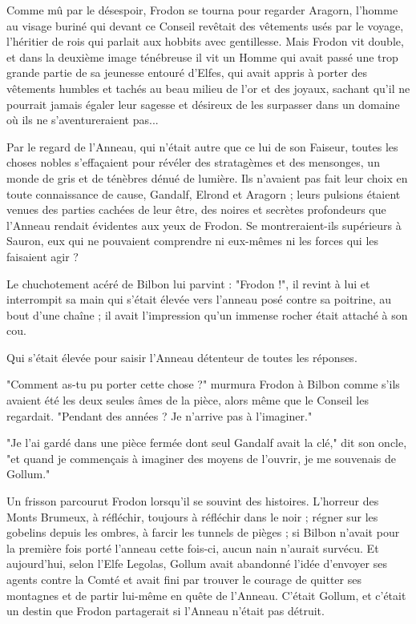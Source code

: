 Comme mû par le désespoir, Frodon se tourna pour regarder Aragorn, l'homme au visage buriné qui devant ce Conseil revêtait des vêtements usés par le voyage, l'héritier de rois qui parlait aux hobbits avec gentillesse. Mais Frodon vit double, et dans la deuxième image ténébreuse il vit un Homme qui avait passé une trop grande partie de sa jeunesse entouré d'Elfes, qui avait appris à porter des vêtements humbles et tachés au beau milieu de l'or et des joyaux, sachant qu'il ne pourrait jamais égaler leur sagesse et désireux de les surpasser dans un domaine où ils ne s'aventureraient pas...

Par le regard de l'Anneau, qui n'était autre que ce lui de son Faiseur, toutes les choses nobles s'effaçaient pour révéler des stratagèmes et des mensonges, un monde de gris et de ténèbres dénué de lumière. Ils n'avaient pas fait leur choix en toute connaissance de cause, Gandalf, Elrond et Aragorn ; leurs pulsions étaient venues des parties cachées de leur être, des noires et secrètes profondeurs que l'Anneau rendait évidentes aux yeux de Frodon. Se montreraient-ils supérieurs à Sauron, eux qui ne pouvaient comprendre ni eux-mêmes ni les forces qui les faisaient agir ?

Le chuchotement acéré de Bilbon lui parvint : "Frodon !", il revint à lui et interrompit sa main qui s'était élevée vers l'anneau posé contre sa poitrine, au bout d'une chaîne ; il avait l'impression qu'un immense rocher était attaché à son cou.

Qui s'était élevée pour saisir l'Anneau détenteur de toutes les réponses.

"Comment as-tu pu porter cette chose ?" murmura Frodon à Bilbon comme s'ils avaient été les deux seules âmes de la pièce, alors même que le Conseil les regardait. "Pendant des années ? Je n'arrive pas à l'imaginer."

"Je l'ai gardé dans une pièce fermée dont seul Gandalf avait la clé," dit son oncle, "et quand je commençais à imaginer des moyens de l'ouvrir, je me souvenais de Gollum."

Un frisson parcourut Frodon lorsqu'il se souvint des histoires. L'horreur des Monts Brumeux, à réfléchir, toujours à réfléchir dans le noir ; régner sur les gobelins depuis les ombres, à farcir les tunnels de pièges ; si Bilbon n'avait pour la première fois porté l'anneau cette fois-ci, aucun nain n'aurait survécu. Et aujourd'hui, selon l'Elfe Legolas, Gollum avait abandonné l'idée d'envoyer ses agents contre la Comté et avait fini par trouver le courage de quitter ses montagnes et de partir lui-même en quête de l'Anneau. C'était Gollum, et c'était un destin que Frodon partagerait si l'Anneau n'était pas détruit.

